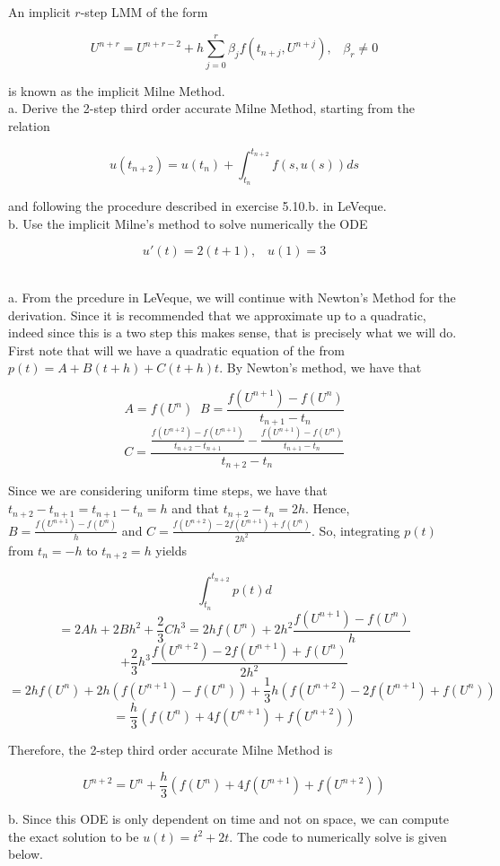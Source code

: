 An implicit $r$-step LMM of the form

$$U^{n+r}=U^{n+r-2}+h\sum_{j=0}^r\beta_jf(t_{n+j},U^{n+j}),\;\;\;\beta_r\neq0$$

is known as the implicit Milne Method.\\
a. Derive the 2-step third order accurate Milne Method, starting from the relation

$$u(t_{n+2})=u(t_n)+\int_{t_n}^{t_{n+2}}f(s,u(s))ds$$

and following the procedure described in exercise 5.10.b. in LeVeque.\\
b. Use the implicit Milne's method to solve numerically the ODE

$$u'(t)=2(t+1),\;\;\;u(1)=3$$

\begin{solution}\renewcommand{\qedsymbol}{}\ \\
    a. From the prcedure in LeVeque, we will continue with Newton's Method for the derivation. Since it
    is recommended that we approximate up to a quadratic, indeed since this is a two step this makes
    sense, that is precisely what we will do. First note that will we have a quadratic equation of the
    from $p(t)=A+B(t+h)+C(t+h)t$. By Newton's method, we have that

    $$A=f(U^n)\;\;B=\frac{f(U^{n+1})-f(U^n)}{t_{n+1}-t_n}$$
    $$C=\frac{\frac{f(U^{n+2})-f(U^{n+1})}{t_{n+2}-t_{n+1}}-\frac{f(U^{n+1})-f(U^n)}{t_{n+1}-t_n}}
    {t_{n+2}-t_n}$$

    Since we are considering uniform time steps, we have that $t_{n+2}-t_{n+1}=t_{n+1}-t_n=h$ and that
    $t_{n+2}-t_n=2h$. Hence, $B=\frac{f(U^{n+1})-f(U^n)}{h}$ and
    $C=\frac{f(U^{n+2})-2f(U^{n+1})+f(U^n)}{2h^2}$. So, integrating $p(t)$ from $t_n=-h$ to $t_{n+2}=h$
    yields

    $$\int_{t_n}^{t_{n+2}}p(t)d$$
    $$=2Ah+2Bh^2+\frac23Ch^3=2hf(U^n)+2h^2\frac{f(U^{n+1})-f(U^n)}{h}$$
    $$+\frac23h^3\frac{f(U^{n+2})-2f(U^{n+1})+f(U^n)}{2h^2}$$
    $$=2hf(U^n)+2h(f(U^{n+1})-f(U^n))+\frac13h(f(U^{n+2})-2f(U^{n+1})+f(U^n))$$
    $$=\frac{h}{3}(f(U^n)+4f(U^{n+1})+f(U^{n+2}))$$

    Therefore, the 2-step third order accurate Milne Method is

    $$U^{n+2}=U^{n}+\frac{h}{3}(f(U^n)+4f(U^{n+1})+f(U^{n+2}))$$

    b. Since this ODE is only dependent on time and not on space, we can compute the exact solution to
    be $u(t)=t^2+2t$. The code to numerically solve is given below.


\end{solution}
